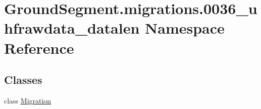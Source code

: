 \hypertarget{namespace_ground_segment_1_1migrations_1_10036__uhfrawdata__datalen}{}\section{Ground\+Segment.\+migrations.0036\+\_\+uhfrawdata\+\_\+datalen Namespace Reference}
\label{namespace_ground_segment_1_1migrations_1_10036__uhfrawdata__datalen}
\subsection*{Classes}
\begin{DoxyCompactItemize}
\item 
class \hyperlink{class_ground_segment_1_1migrations_1_10036__uhfrawdata__datalen_1_1_migration}{Migration}
\end{DoxyCompactItemize}
